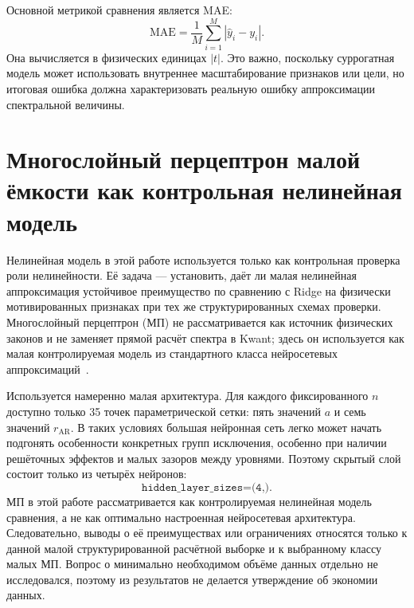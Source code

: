 Основной метрикой сравнения является MAE:
\begin{equation}
  \mathrm{MAE}
  =
  \frac{1}{M}
  \sum_{i=1}^{M}
  \left|\hat{y}_i-y_i\right| .
\end{equation}
Она вычисляется в физических единицах $|t|$. Это важно, поскольку суррогатная модель может
использовать внутреннее масштабирование признаков или цели, но итоговая ошибка должна
характеризовать реальную ошибку аппроксимации спектральной величины.

\section{Многослойный перцептрон малой ёмкости как контрольная нелинейная модель}

Нелинейная модель в этой работе используется только как контрольная проверка роли
нелинейности. Её задача --- установить, даёт ли малая нелинейная аппроксимация устойчивое
преимущество по сравнению с Ridge на физически мотивированных признаках при тех же
структурированных схемах проверки. Многослойный перцептрон (МП) не рассматривается как
источник физических законов и не заменяет прямой расчёт спектра в Kwant; здесь он
используется как малая контролируемая модель из стандартного класса нейросетевых
аппроксимаций~\cite{bishop2006prml}.

Используется намеренно малая архитектура. Для каждого фиксированного $n$ доступно только
35 точек параметрической сетки: пять значений $a$ и семь значений $r_{\mathrm{AR}}$. В
таких условиях большая нейронная сеть легко может начать подгонять особенности конкретных
групп исключения, особенно при наличии решёточных эффектов и малых зазоров между уровнями.
Поэтому скрытый слой состоит только из четырёх нейронов:
\[
  \texttt{hidden\_layer\_sizes=(4,)}.
\]
МП в этой работе рассматривается как контролируемая нелинейная модель сравнения, а не как
оптимально настроенная нейросетевая архитектура. Следовательно, выводы о её преимуществах
или ограничениях относятся только к данной малой структурированной расчётной выборке и к
выбранному классу малых МП.
Вопрос о минимально необходимом объёме данных отдельно не исследовался, поэтому из
результатов не делается утверждение об экономии данных.

